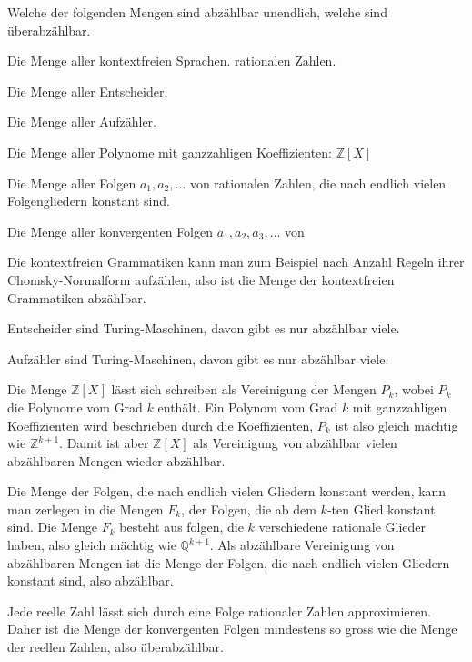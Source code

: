 Welche der folgenden Mengen sind abzählbar unendlich, welche sind
überabzählbar.
\begin{teilaufgaben}
\item Die Menge aller kontextfreien Sprachen.
rationalen Zahlen.
\item Die Menge aller Entscheider.
\item Die Menge aller Aufzähler.
\item Die Menge aller Polynome mit ganzzahligen Koeffizienten:
${\mathbb Z}[X]$
\item Die Menge aller Folgen $a_1,a_2,\dots$ von rationalen Zahlen,
die nach endlich vielen Folgengliedern konstant sind.
\item Die Menge aller konvergenten Folgen $a_1,a_2,a_3,\dots$ von
\end{teilaufgaben}


\begin{loesung}
\begin{teilaufgaben}
\item Die kontextfreien Grammatiken kann man zum Beispiel nach
Anzahl Regeln ihrer Chomsky-Normalform aufzählen, also ist
die Menge der kontextfreien Grammatiken abzählbar.
\item Entscheider sind Turing-Maschinen, davon gibt es nur abzählbar viele.
\item Aufzähler sind Turing-Maschinen, davon gibt es nur abzählbar viele.
\item Die Menge ${\mathbb Z}[X]$ lässt sich schreiben als Vereinigung
der Mengen $P_k$, wobei $P_k$ die Polynome vom Grad $k$ enthält.
Ein Polynom vom Grad $k$ mit ganzzahligen Koeffizienten wird beschrieben
durch die Koeffizienten, $P_k$ ist also gleich mächtig wie $\mathbb Z^{k+1}$.
Damit ist aber ${\mathbb Z}[X]$ als Vereinigung von abzählbar vielen
abzählbaren Mengen wieder abzählbar.
\item Die Menge der Folgen, die nach endlich vielen Gliedern konstant
werden, kann man zerlegen in die Mengen $F_k$, der Folgen, die ab dem
$k$-ten Glied konstant sind. Die Menge $F_k$ besteht aus folgen, die
$k$ verschiedene rationale Glieder haben, also gleich mächtig wie
$\mathbb Q^{k+1}$. Als abzählbare Vereinigung von abzählbaren Mengen
ist die Menge der Folgen, die nach endlich vielen Gliedern konstant sind,
also abzählbar.
\item Jede reelle Zahl lässt sich durch eine Folge rationaler Zahlen
approximieren. Daher ist die Menge der konvergenten Folgen mindestens
so gross wie die Menge der reellen Zahlen, also überabzählbar.
\qedhere
\end{teilaufgaben}
\end{loesung}


